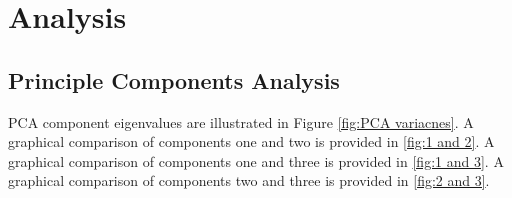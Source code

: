 \documentclass[3p,times]{elsarticle}
\begin{document}
%





\section{Analysis}
\label{sec:analysis}


\subsection{Principle Components Analysis}
PCA component eigenvalues are illustrated in Figure \ref{fig:PCA variacnes}. A graphical comparison of components one and two is provided in \ref{fig:1 and 2}. A graphical comparison of components one and three is provided in \ref{fig:1 and 3}. A graphical comparison of components two and three is provided in \ref{fig:2 and 3}.
\end{document}
